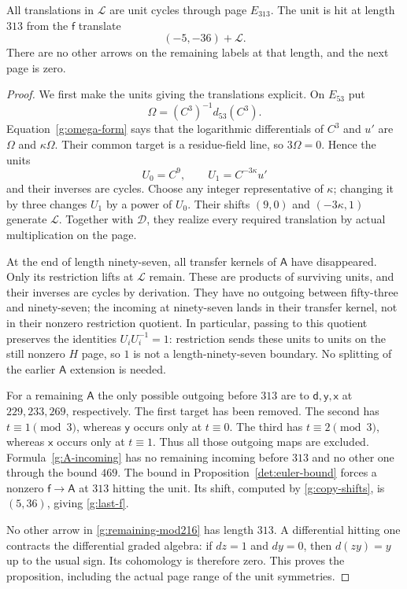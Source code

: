 \begin{proposition}\label{g:unit313}
All translations in $\mathcal L$ are unit cycles through
page $E_{313}$.  The unit is hit at length $313$ from
the $\mathsf f$ translate
\begin{equation}\label{g:last-f}
 (-5,-36)+\mathcal L.
\end{equation}
There are no other arrows on the remaining labels at
that length, and the next page is zero.
\end{proposition}

\begin{proof}
We first make the units giving the translations explicit.
On $E_{53}$ put
\[
 \Omega=(C^3)^{-1}d_{53}(C^3).
\]
Equation~\eqref{g:omega-form} says that the logarithmic
differentials of $C^3$ and $u'$ are $\Omega$ and
$\kappa\Omega$.  Their common target is a
residue-field line, so $3\Omega=0$.  Hence the units
\begin{equation}\label{g:lattice-generators}
 U_0=C^9,\qquad U_1=C^{-3\kappa}u'
\end{equation}
and their inverses are cycles.  Choose any integer
representative of $\kappa$; changing it by three
changes $U_1$ by a power of $U_0$.
Their shifts $(9,0)$ and $(-3\kappa,1)$ generate
$\mathcal L$.  Together with $\mathcal D$, they
realize every required translation by actual
multiplication on the page.

At the end of length ninety-seven, all transfer
kernels of $\mathsf A$ have disappeared.  Only its
restriction lifts at $\mathcal L$ remain.  These
are products of surviving units, and their inverses
are cycles by derivation.  They have no outgoing
between fifty-three and ninety-seven; the incoming
at ninety-seven lands in their transfer kernel,
not in their nonzero restriction quotient.
In particular, passing to this quotient preserves
the identities $U_iU_i^{-1}=1$: restriction sends
these units to units on the still nonzero $H$ page,
so $1$ is not a length-ninety-seven boundary.
No splitting of the earlier $\mathsf A$ extension
is needed.

For a remaining $\mathsf A$ the only possible
outgoing before $313$ are to $\mathsf d,\mathsf y,
\mathsf x$ at $229,233,269$, respectively.  The
first target has been removed.  The second has
$t\equiv1\pmod3$, whereas $\mathsf y$ occurs
only at $t\equiv0$.  The third has
$t\equiv2\pmod3$, whereas $\mathsf x$ occurs
only at $t\equiv1$.  Thus all those outgoing
maps are excluded.  Formula~\eqref{g:A-incoming}
has no remaining incoming before $313$ and no
other one through the bound $469$.  The bound in
Proposition~\ref{det:euler-bound} forces a nonzero
$\mathsf f\to\mathsf A$ at $313$ hitting the
unit.  Its shift, computed by
\eqref{g:copy-shifts}, is $(5,36)$, giving
\eqref{g:last-f}.

No other arrow in \eqref{g:remaining-mod216}
has length $313$.  A differential hitting one
contracts the differential graded algebra:
if $dz=1$ and $dy=0$, then $d(zy)=y$ up to the
usual sign.  Its cohomology is therefore zero.
This proves the proposition, including the actual
page range of the unit symmetries.
\end{proof}

